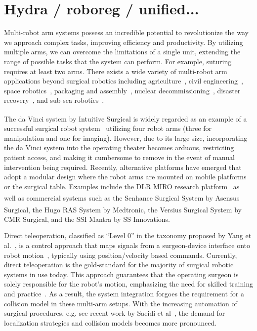 \graphicspath{{chapter_4}}
\chapter[Short tile for table of content]{Hydra / roboreg / unified...}
\label{chap:registration}
\minitoc
Multi-robot arm systems possess an incredible potential to revolutionize the way we approach complex tasks, improving efficiency and productivity. 
By utilizing multiple arms, we can overcome the limitations of a single unit, extending the range of possible tasks that the system can perform. 
For example, suturing requires at least two arms.
There exists a wide variety of multi-robot arm applications beyond surgical robotics including 
agriculture~\cite{Xiong20}, 
civil engineering~\cite{Yasutomi23}, 
space robotics~\cite{Yan20},
packaging and assembly~\cite{Do12},
nuclear decommissioning~\cite{Mohamed07},
disaster recovery~\cite{Kamezaki16}, and
sub-sea robotics~\cite{Brantner21}.

The da Vinci\textsuperscript{\textregistered} system by Intuitive Surgical is widely regarded as an example of a successful surgical robot system~\cite{yang2018grand, DEttorre2021} utilizing four robot arms (three for manipulation and one for imaging).
However, due to its large size, incorporating the da Vinci system into the operating theater becomes arduous, restricting patient access, and making it cumbersome to remove in the event of manual intervention being required.
Recently, alternative platforms have emerged that adopt a modular design where the robot arms are mounted on mobile platforms or the surgical table. 
Examples include the 
DLR MIRO research platform~\citep{miro}
as well as commercial systems such as 
the Senhance\textsuperscript{\texttrademark} Surgical System by Asensus Surgical, 
the Hugo\textsuperscript{\texttrademark} RAS System by Medtronic, 
the Versius\textsuperscript{\textregistered} Surgical System by CMR Surgical, and 
the SSI Mantra by SS Innovations.

Direct teleoperation, classified as ``Level 0'' in the taxonomy proposed by Yang et al.~\cite{Yang2017}, is a control approach that maps signals from a surgeon-device interface onto robot motion~\cite{Niemeyer2008}, typically using position/velocity based commands.
Currently, direct teleoperation is the gold-standard for the majority of surgical robotic systems in use today.
This approach guarantees that the operating surgeon is solely responsible for the robot's motion, emphasizing the need for skilled training and practice~\cite{Liu15}. 
As a result, the system integration forgoes the requirement for a collision model in these multi-arm setups.
With the increasing automation of surgical procedures, e.g. see recent work by Saeidi et al~\cite{Saeidi2022}, the demand for localization strategies and collision models becomes more pronounced.

